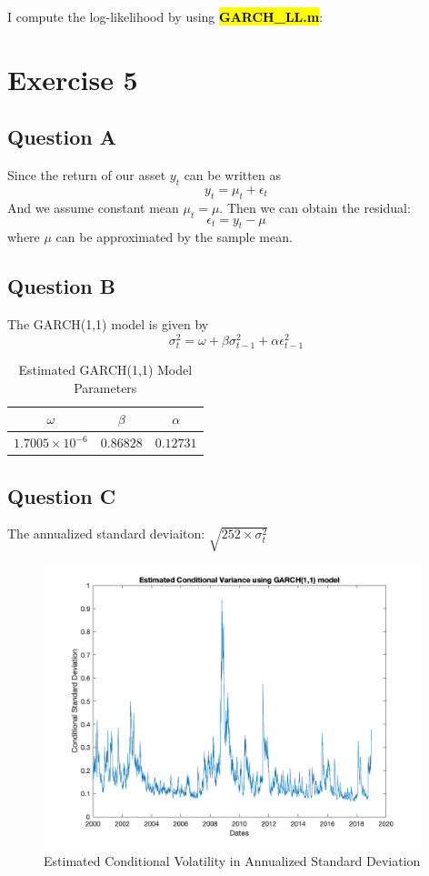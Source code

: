 \documentclass{report}
\begin{document}
I compute the log-likelihood by using \hl{\textbf{GARCH\_LL.m}}:




\section*{Exercise 5}
\subsection*{Question A}
Since the return of our asset $y_t$ can be written as
\begin{equation}
	y_t=\mu_t+\epsilon_t
\end{equation}
And we assume constant mean $\mu_t=\mu$. Then we can obtain the residual:
\begin{equation}
	\epsilon_t=y_t-\mu
\end{equation}
where $\mu$ can be approximated by the sample mean.

\subsection*{Question B}


The GARCH(1,1) model is given by
\begin{equation}
\sigma_t^2=\omega+\beta \sigma^2_{t-1}+\alpha \epsilon_{t-1}^2
\end{equation}

\begin{table}[H]
	\begin{center}
		\caption{Estimated GARCH(1,1) Model Parameters}
		\label{tab:table8}
		\vspace{2mm}
		\begin{tabular}{c|c|c} 
			
			\textbf{$\omega$} & \textbf{$\beta$}& \textbf{$\alpha$} \\
			\hline
			
			$1.7005\times 10^{-6}$ &$0.86828$ & $0.12731$  
		\end{tabular}
	\end{center}
\end{table}



\subsection*{Question C}

The annualized standard deviaiton: $\sqrt{252\times \sigma^2_t}$

\begin{figure}[H]
	\centering
	\includegraphics[width = 11cm]{fig/5c}
	\caption{Estimated Conditional Volatility in Annualized Standard Deviation } 
\end{figure}
\end{document}

